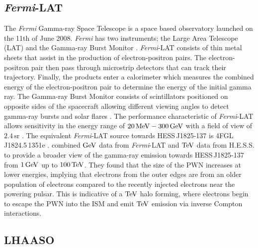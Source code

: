 \subsection{\textit{Fermi}-LAT}

The \textit{Fermi} Gamma-ray Space Telescope is a space based observatory launched on the 11th of June 2008. \textit{Fermi} has two instruments; the Large Area Telescope (LAT) and the Gamma-ray Burst Monitor \citep{2010RPPh...73g4901M}. \textit{Fermi}-LAT consists of thin metal sheets that assist in the production of electron-positron pairs. The electron-positron pair then pass through microstrip detectors that can track their trajectory. Finally, the products enter a calorimeter which measures the combined energy of the electron-positron pair to determine the energy of the initial gamma ray. The Gamma-ray Burst Monitor consists of scintillators positioned on opposite sides of the spacecraft allowing different viewing angles to detect gamma-ray bursts and solar flares \citep{2010RPPh...73g4901M}. The performance characteristic of \textit{Fermi}-LAT allows sensitivity in the energy range of $20\,\si{\mega\electronvolt} - 300\,\si{\giga\electronvolt}$ with a field of view of $2.4\,\si{\steradian}$ \citep{2010RPPh...73g4901M}. 
\newpar
The equivalent \textit{Fermi}-LAT source towards \mbox{HESS\,J1825-137} is \mbox{4FGL\,J1824.5\,1351e} \citep{2020ApJS..247...33A}. \cite{2020A&A...640A..76P} combined $\si{\giga\electronvolt}$ data from \textit{Fermi}-LAT and $\TeV$ data from H.E.S.S. to provide a broader view of the gamma-ray emission towards \mbox{HESS\,J1825-137} from $1\,\si{\giga\electronvolt}$ up to $100\,\TeV$. They found that the size of the PWN increases at lower energies, implying that electrons from the outer edges are from an older population of electrons compared to the recently injected electrons near the powering pulsar. This is indicative of a $\TeV$ halo forming, where electrons begin to escape the PWN into the ISM and emit $\TeV$ emission via inverse Compton interactions.

\subsection{LHAASO}

